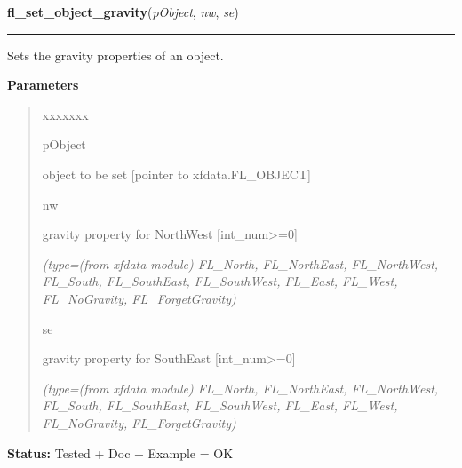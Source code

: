 \hspace{.8\funcindent}\begin{boxedminipage}{\funcwidth}

    \raggedright \textbf{fl\_set\_object\_gravity}(\textit{pObject}, \textit{nw}, \textit{se})

    \vspace{-1.5ex}

    \rule{\textwidth}{0.5\fboxrule}
\setlength{\parskip}{2ex}
    Sets the gravity properties of an object.

\setlength{\parskip}{1ex}
      \textbf{Parameters}
      \vspace{-1ex}

      \begin{quote}
        \begin{Ventry}{xxxxxxx}

          \item[pObject]

          object to be set [pointer to xfdata.FL\_OBJECT]

          \item[nw]

          gravity property for NorthWest [int\_num{\textgreater}=0]

            {\it (type=(from xfdata module) FL\_North, FL\_NorthEast, FL\_NorthWest, FL\_South, 
FL\_SouthEast, FL\_SouthWest, FL\_East, FL\_West, FL\_NoGravity, 
FL\_ForgetGravity)}

          \item[se]

          gravity property for SouthEast [int\_num{\textgreater}=0]

            {\it (type=(from xfdata module) FL\_North, FL\_NorthEast, FL\_NorthWest, FL\_South, 
FL\_SouthEast, FL\_SouthWest, FL\_East, FL\_West, FL\_NoGravity, 
FL\_ForgetGravity)}

        \end{Ventry}

      \end{quote}

\textbf{Status:} Tested + Doc + Example = OK



    \end{boxedminipage}

    \label{xformslib:library:fl_get_object_gravity}

